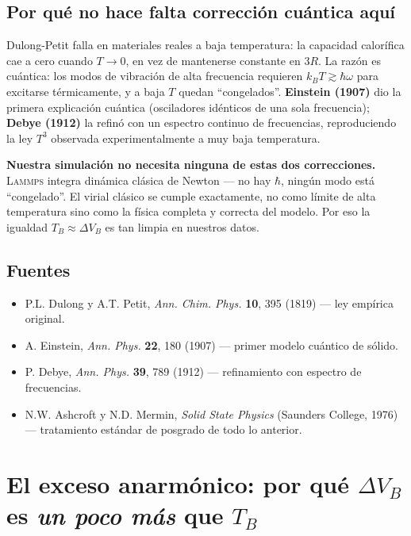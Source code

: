 \documentclass[11pt,a4paper]{article}
\newcommand{\kb}{k_B}
\newcommand{\lammps}{\textsc{Lammps}}
\newcommand{\clave}[1]{\textcolor{red!55!black}{\textbf{#1}}}
\begin{document}
\subsection{Por qué no hace falta corrección cuántica aquí}

Dulong-Petit falla en materiales reales a baja temperatura: la capacidad
calorífica cae a cero cuando $T\to0$, en vez de mantenerse constante en
$3R$. La razón es cuántica: los modos de vibración de alta frecuencia
requieren $\kb T \gtrsim \hbar\omega$ para excitarse térmicamente, y a
baja $T$ quedan ``congelados''. \textbf{Einstein (1907)} dio la primera
explicación cuántica (osciladores idénticos de una sola frecuencia);
\textbf{Debye (1912)} la refinó con un espectro continuo de frecuencias,
reproduciendo la ley $T^3$ observada experimentalmente a muy baja
temperatura.

\clave{Nuestra simulación no necesita ninguna de estas dos correcciones.}
\lammps{} integra dinámica clásica de Newton --- no hay $\hbar$, ningún
modo está ``congelado''. El virial clásico se cumple exactamente, no como
límite de alta temperatura sino como la física completa y correcta del
modelo. Por eso la igualdad $T_B\approx\Delta V_B$ es tan limpia en
nuestros datos.

\subsection{Fuentes}
\begin{itemize}[leftmargin=1.4em]
\item P.L. Dulong y A.T. Petit, \textit{Ann. Chim. Phys.} \textbf{10}, 395
(1819) --- ley empírica original.
\item A. Einstein, \textit{Ann. Phys.} \textbf{22}, 180 (1907) --- primer
modelo cuántico de sólido.
\item P. Debye, \textit{Ann. Phys.} \textbf{39}, 789 (1912) --- refinamiento
con espectro de frecuencias.
\item N.W. Ashcroft y N.D. Mermin, \textit{Solid State Physics} (Saunders
College, 1976) --- tratamiento estándar de posgrado de todo lo anterior.
\end{itemize}

\section{El exceso anarmónico: por qué $\Delta V_B$ es \emph{un poco más}
que $T_B$}
\label{sec:anarmonia}
\end{document}
